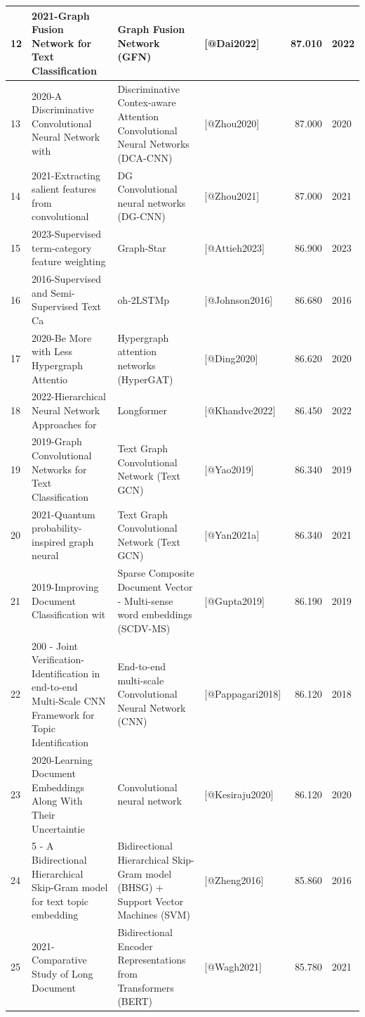 \documentclass[
]{article}
\begin{document}
\begin{table}
\begin{tabular}[t]{l|l|l|l|r|l}
\hline
12 & 2021-Graph Fusion Network for Text Classification & Graph Fusion Network (GFN) & [@Dai2022] & 87.010 & 2022\\
\hline
13 & 2020-A Discriminative Convolutional Neural Network with & Discriminative Contex-aware Attention Convolutional Neural Networks (DCA-CNN) & [@Zhou2020] & 87.000 & 2020\\
\hline
14 & 2021-Extracting salient features from convolutional & DG Convolutional neural networks (DG-CNN) & [@Zhou2021] & 87.000 & 2021\\
\hline
15 & 2023-Supervised term-category feature weighting & Graph-Star & [@Attieh2023] & 86.900 & 2023\\
\hline
16 & 2016-Supervised and Semi-Supervised Text Ca & oh-2LSTMp & [@Johnson2016] & 86.680 & 2016\\
\hline
17 & 2020-Be More with Less Hypergraph Attentio & Hypergraph attention networks (HyperGAT) & [@Ding2020] & 86.620 & 2020\\
\hline
18 & 2022-Hierarchical Neural Network Approaches for & Longformer & [@Khandve2022] & 86.450 & 2022\\
\hline
19 & 2019-Graph Convolutional Networks for Text Classification & Text Graph Convolutional Network (Text GCN) & [@Yao2019] & 86.340 & 2019\\
\hline
20 & 2021-Quantum probability-inspired graph neural & Text Graph Convolutional Network (Text GCN) & [@Yan2021a] & 86.340 & 2021\\
\hline
21 & 2019-Improving Document Classification wit & Sparse Composite Document Vector - Multi-sense word embeddings (SCDV-MS) & [@Gupta2019] & 86.190 & 2019\\
\hline
22 & 200 - Joint Verification-Identification in end-to-end Multi-Scale CNN Framework for Topic Identification & End-to-end multi-scale Convolutional Neural Network (CNN) & [@Pappagari2018] & 86.120 & 2018\\
\hline
23 & 2020-Learning Document Embeddings Along With Their Uncertaintie & Convolutional neural network & [@Kesiraju2020] & 86.120 & 2020\\
\hline
24 & 5 - A Bidirectional Hierarchical Skip-Gram model for text topic embedding & Bidirectional Hierarchical Skip-Gram model (BHSG) + Support Vector Machines (SVM) & [@Zheng2016] & 85.860 & 2016\\
\hline
25 & 2021-Comparative Study of Long Document & Bidirectional Encoder Representations from Transformers  (BERT) & [@Wagh2021] & 85.780 & 2021\\

\end{tabular}
\end{table}
\end{document}
